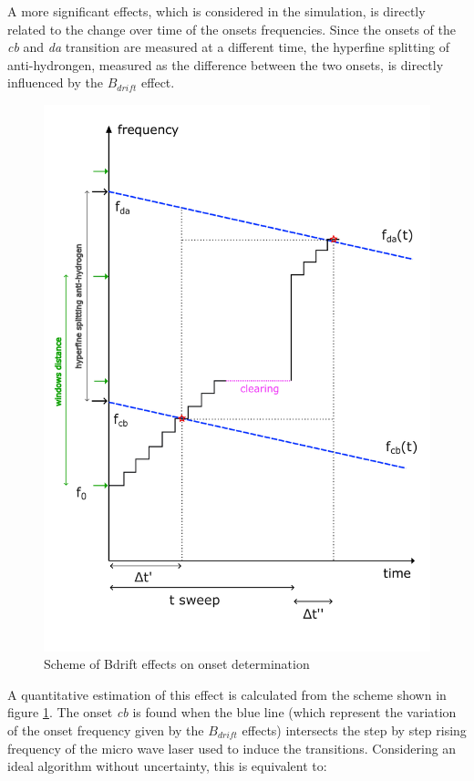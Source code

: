 \documentclass[11pt,a4paper,oneside]{article}
\begin{document}
A more significant effects, which is considered in the simulation, is directly related to the change over time of the onsets frequencies. Since the onsets of the \textit{cb} and \textit{da} transition are measured at a different time, the hyperfine splitting of anti-hydrongen, measured as the difference between the two onsets, is directly influenced by the $B_{drift}$ effect. 

\begin{figure}[!hbtp]
\centering
\includegraphics[scale= 0.8]{SchemeBdrift.pdf}
\caption{Scheme of Bdrift effects on onset determination}\label{fig:SchemeBdrift}
\end{figure}


A quantitative estimation of this effect is calculated from the scheme shown in figure \ref{fig:SchemeBdrift}. The onset \textit{cb} is found when the blue line (which represent the variation of the onset frequency given by the $B_{drift}$ effects) intersects the step by step rising frequency of the micro wave laser used to induce the transitions. Considering an ideal algorithm without uncertainty, this is equivalent to:
\end{document}
